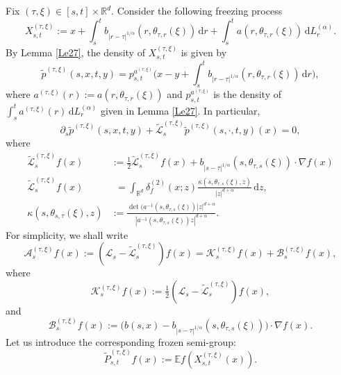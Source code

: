 \documentclass[JEP,XML,SOM,Unicode,published]{cedram}
\theoremstyle{plain}
\theoremstyle{definition}
\let\p\partial
\let\wt\widetilde
\newcommand\cL{{\mathcal L}}
\newcommand\mE{\mathbb{E}}
\newcommand\mR{\mathbb{R}}
\newcommand\1{{\mathbf{1}}}
\newcommand\sA{{\mathscr A}}
\newcommand\sB{{\mathscr B}}
\newcommand\sK{{\mathscr K}}
\newcommand\sL{{\mathscr L}}
\newcommand{\dif}{\,\mathrm{d}}
\begin{document}
Fix $(\tau,\xi)\in[s,t]\times\mR^d$. Consider the following freezing process
\[
X^{(\tau,\xi)}_{s,t}:=x+\int^t_s b_{|r-\tau|^{1/\alpha}}(r, \theta_{\tau,r}(\xi))\dif r+\int^t_s a(r, \theta_{\tau,r}(\xi))\dif L^{(\alpha)}_r.
\]
By Lemma \ref{Le27}, the density of $X^{(\tau,\xi)}_{s,t}$ is given by
\begin{equation}\label{KP8}
\tilde p^{(\tau,\xi)}(s,x,t,y)= p_{s,t}^{a^{(\tau,\xi)}}\biggl(x-y+\int^t_s b_{|r-\tau|^{1/\alpha}}(r, \theta_{\tau,r}(\xi))\dif r\biggr),
\end{equation}
where $a^{(\tau,\xi)}(r):=a(r,\theta_{\tau,r}(\xi)) $ and $p_{s,t}^{a^{(\tau,\xi)}}$ is the density of $\int^t_s a^{(\tau,\xi)}(r)\dif L^{(\alpha)}_r$
given in Lemma \ref{Le27}. In particular,
\begin{equation}\label{KOLMO_FREEZE}
\p_s \tilde p^{(\tau,\xi)}(s,x,t,y)+{\tilde \sL}^{(\tau,\xi)}_s{\tilde p}^{(\tau,\xi)}(s,\cdot,t,y)(x)=0,
\end{equation}
where
\begin{align*}
\tilde \sL^{(\tau,\xi)}_{s} f(x)&:=\tfrac 12\tilde \cL^{(\tau,\xi)}_{s} f(x)+b_{|s-\tau|^{1/\alpha}}(s, \theta_{\tau,s}(\xi))\cdot\nabla f(x)\\
\tag*{and}
\tilde \cL^{(\tau,\xi)}_{s} f(x)&\phantom{:}=\int_{\mR^d}\delta^{(2)}_f(x;z)\frac{\kappa(s,\theta_{\tau,s}(\xi),z)}{|z|^{d+\alpha}}\dif z,\\
\tag*{with}
\kappa(s,\theta_{s,\tau}(\xi),z)&:=\frac{\det(a^{-1}(s,\theta_{\tau,s}(\xi))|z|^{d+\alpha}}{|a^{-1}(s,\theta_{\tau,s}(\xi))z|^{d+\alpha}}.
\end{align*}
For simplicity, we shall write
\begin{equation*}
\sA^{(\tau,\xi)}_{s}f(x):=(\sL_{s}-\tilde \sL^{(\tau,\xi)}_{s})f(x)=\sK^{(\tau,\xi)}_{s}f(x)+\sB^{(\tau,\xi)}_{s}f(x),%
\end{equation*}
where\label{WHERE_K_B_DEFINED}
\begin{equation}\label{SM1}
\sK^{(\tau,\xi)}_{s}f(x):=\tfrac 12(\cL_{s}-\tilde \cL^{(\tau,\xi)}_{s})f(x),
\end{equation}
and
\begin{equation}\label{SM2}
\sB^{(\tau,\xi)}_{s}f(x):=\bigl(b(s,x)-b_{|s-\tau|^{1/\alpha}}(s, \theta_{\tau,s}(\xi))\bigr)\cdot\nabla f(x).
\end{equation}
Let us introduce the corresponding frozen semi-group:
\begin{equation}\label{TPT}
\wt P^{(\tau,\xi)}_{s,t}f(x):=\mE f(X^{(\tau,\xi)}_{s,t}(x)).
\end{equation}
\end{document}

